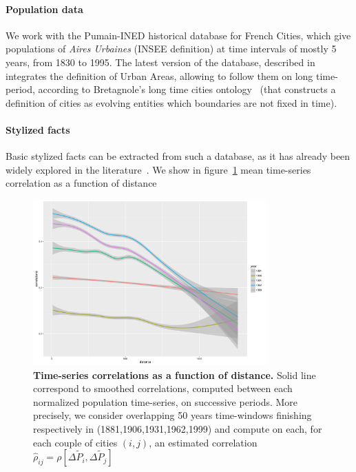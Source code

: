 \documentclass[Royal,sageh,times]{sagej}
\begin{document}
\paragraph{Population data}

We work with the Pumain-INED historical database for French Cities, which give populations of \emph{Aires Urbaines} (INSEE definition) at time intervals of mostly 5 years, from 1830 to 1995. %
The latest version of the database, described in~\cite{pumain1986fichier} integrates the definition of Urban Areas, allowing to follow them on long time-period, according to Bretagnole's long time cities ontology~\cite{bretagnolle:tel-00459720} (that constructs a definition of cities as evolving entities which boundaries are not fixed in time).


\paragraph{Stylized facts}

Basic stylized facts can be extracted from such a database, as it has already been widely explored in the literature~\cite{}. %
 We show in figure~\ref{fig:ts-correlations} mean time-series correlation as a function of distance




\begin{figure}
\centering
\includegraphics[width=0.8\textwidth]{figures/empirical_tsCorrelations}
\caption{\textbf{Time-series correlations as a function of distance.} Solid line correspond to smoothed correlations, computed between each normalized population time-series, on successive periods. More precisely, we consider overlapping 50 years time-windows finishing respectively in (1881,1906,1931,1962,1999) and compute on each, for each couple of cities $(i,j)$, an estimated correlation $\hat{\rho}_{ij}=\rho\left[\Delta \tilde{P}_i, \Delta \tilde{P}_j\right]$}
\label{fig:ts-correlations}
\end{figure}
\end{document}
